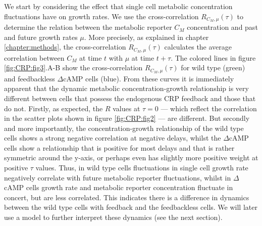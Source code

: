 %
We start by considering the effect that single cell metabolic concentration fluctuations have on growth rates.
%
We use the 
cross-correlation $R_{C_M,\mu}(\tau)$ to determine the relation between the metabolic reporter $C_M$ concentration and past and future growth rates $\mu$.
%
More precisely, as explained in chapter \ref{chapter:methods}, the cross-correlation $R_{C_M,\mu}(\tau)$ calculates the average correlation between $C_M$ at time $t$ with $\mu$ at time $t+\tau$.
%
The colored lines in figure \ref{fig:CRP:fig3}.A-B show the cross-correlation $R_{C_M,\mu}(\tau)$ for wild type (green) and feedbackless $\Delta$cAMP cells (blue).
%
%
From these curves it is immediately apparent that the dynamic metabolic concentration-growth relationship is very different between cells 
that possess the endogenous CRP feedback and those that do not.
%
Firstly, as expected, the $R$ values at $\tau=0$ --- which reflect the correlation in the scatter plots shown in figure \ref{fig:CRP:fig2} --- are different.
But secondly and more importantly, 
%
the concentration-growth relationship of the wild type cells shows a strong negative correlation at negative delays, 
whilst the $\Delta$cAMP cells show a relationship that is positive for most delays and that is rather symmetric around the y-axis, or perhaps even has slightly more positive weight at positive $\tau$ values.
%
%
Thus, in wild type cells fluctuations in single cell growth rate negatively correlate with future metabolic reporter fluctuations, 
whilst in $\Delta$cAMP cells growth rate and metabolic reporter concentration fluctuate in concert, but are less correlated.
%
This indicates there is a difference in dynamics between the wild type cells with feedback and the feedbackless cells.
%
We will later use a model to further interpret these dynamics (see the next section).



